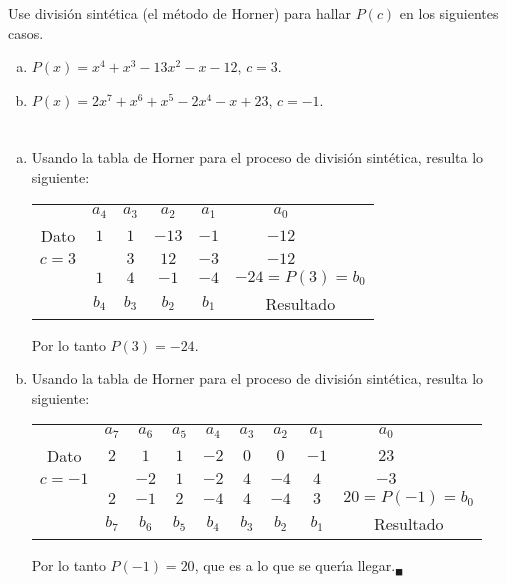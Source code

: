 \begin{enunciado}
 Use divisi\'on sint\'etica (el m\'etodo de Horner) para hallar $P(c)$ en los siguientes casos.
 \begin{enumerate}[(a)]
  \item $P(x) = x^4 + x^3 - 13x^2 - x - 12$, $c=3$.
  
  \item $P(x) = 2x^7 + x^6 + x^5 - 2x^4 - x + 23$, $c = -1$.
 \end{enumerate}
\end{enunciado}

\begin{solucion}
 $\phantom{0}$
 \begin{enumerate}[(a)]
  \item Usando la tabla de Horner para el proceso de divisi\'on sint\'etica, resulta lo siguiente:
  \begin{center}
   \begin{tabular}{ccccccc}
    & $a_4$ & $a_3$ & $a_2$ & $a_1$ & $a_0$ \\
    \cline{1-1} 
    \multicolumn{1}{c|}{Dato} & $1$ & $1$ & $-13$ & $-1$ & $-12$ \\
    \multicolumn{1}{c|}{$c=3$} & & $3$ & $12$ & $-3$ & $-12$ \\
    \hline 
    & $1$ & $4$ & $-1$ & $-4$ & \multicolumn{2}{|l}{$-24 = P(3) = b_0$} \\
    & $b_4$ & $b_3$ & $b_2$ & $b_1$ & \multicolumn{2}{|c}{Resultado} \\
    \cline{6-7}
   \end{tabular}
  \end{center}
  Por lo tanto $P(3) = -24$.
  
  \item Usando la tabla de Horner para el proceso de divisi\'on sint\'etica, resulta lo siguiente:
  \begin{center}
   \begin{tabular}{cccccccccc}
    & $a_7$ & $a_6$ & $a_5$ & $a_4$ & $a_3$ & $a_2$ & $a_1$ & $a_0$ \\
    \cline{1-1} 
    \multicolumn{1}{c|}{Dato} & $2$ & $1$ & $1$ & $-2$ & $0$ & $0$ & $-1$ & $23$ \\
    \multicolumn{1}{c|}{$c=-1$} & & $-2$ & $1$ & $-2$ & $4$ & $-4$ & $4$ & $-3$ \\
    \hline 
    & $2$ & $-1$ & $2$ & $-4$ & $4$ & $-4$ & $3$ & \multicolumn{2}{|l}{$20 = P(-1) = b_0$} \\
    & $b_7$ & $b_6$ & $b_5$  & $b_4$ & $b_3$ & $b_2$ & $b_1$ & \multicolumn{2}{|c}{Resultado} \\
    \cline{9-10}
   \end{tabular}
  \end{center}
  Por lo tanto $P(-1) = 20$, que es a lo que se quer\'{\i}a llegar.${}_{\blacksquare}$
 \end{enumerate}
\end{solucion}
